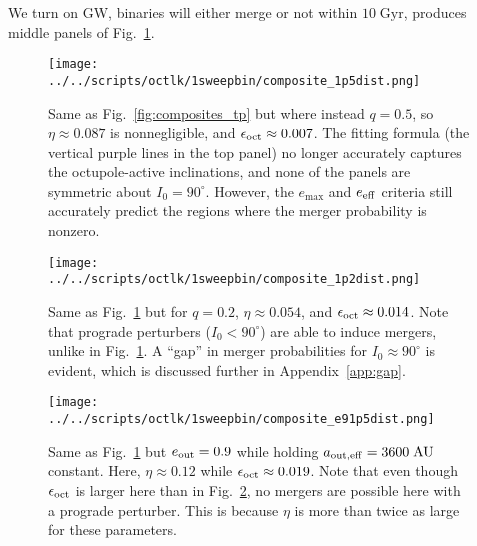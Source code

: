 \documentclass[
        fleqn,
        usenatbib,
    ]{mnras}
\newlength{\colummwidth}
\begin{document}
We turn on GW, binaries will either merge or not within $10\;\mathrm{Gyr}$,
produces middle panels of Fig.~\ref{fig:composites_dist}.
\begin{figure}
    \centering
    \texttt{[image: ../../scripts/octlk/1sweepbin/composite\_1p5dist.png]}
    \caption{Same as Fig.~\ref{fig:composites_tp} but where instead $q = 0.5$,
    so $\eta \approx 0.087$ is nonnegligible, and $\epsilon_{\rm oct} \approx
    0.007$. The \citet{MLL16} fitting formula (the vertical purple lines in the
    top panel) no longer accurately captures the octupole-active inclinations,
    and none of the panels are symmetric about $I_0 = 90^\circ$. However, the
    $e_{\max}$ and $e_{\rm eff}$ criteria still accurately predict the regions
    where the merger probability is nonzero. }\label{fig:composites_dist}
\end{figure}
\begin{figure}
    \centering
    \texttt{[image: ../../scripts/octlk/1sweepbin/composite\_1p2dist.png]}
    \caption{Same as Fig.~\ref{fig:composites_dist} but for $q = 0.2$, $\eta
    \approx 0.054$, and $\epsilon_{\rm oct} \approx 0.014$. Note that prograde
    perturbers ($I_0 < 90^\circ$) are able to induce mergers, unlike in
    Fig.~\ref{fig:composites_dist}. A ``gap'' in merger probabilities for $I_0
    \approx 90^\circ$ is evident, which is discussed further in
    Appendix~\ref{app:gap}. }\label{fig:composites_1p2}
\end{figure}
\begin{figure}
    \centering
    \texttt{[image: ../../scripts/octlk/1sweepbin/composite\_e91p5dist.png]}
    \caption{Same as Fig.~\ref{fig:composites_dist} but $e_{\rm out} = 0.9$
    while holding $a_{\rm out, eff} = 3600\;\mathrm{AU}$ constant. Here, $\eta
    \approx 0.12$ while $\epsilon_{\rm oct} \approx 0.019$. Note that even
    though $\epsilon_{\rm oct}$ is larger here than in
    Fig.~\ref{fig:composites_1p2}, no mergers are possible here with a prograde
    perturber. This is because $\eta$ is more than twice as large for these
    parameters.
    }\label{fig:composites_e91p5}
\end{figure}
\end{document}
